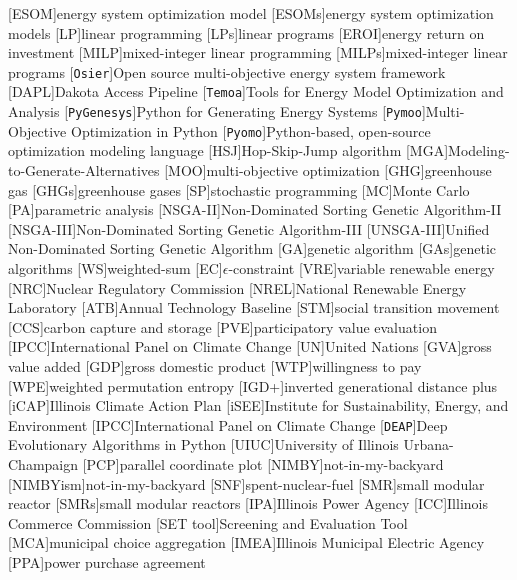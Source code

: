 [ESOM]{energy system optimization model}
[ESOMs]{energy system optimization models}
[LP]{linear programming}
[LPs]{linear programs}
[EROI]{energy return on investment}
[MILP]{mixed-integer linear programming}
[MILPs]{mixed-integer linear programs}
[\texttt{Osier}]{Open source multi-objective energy system framework}
[DAPL]{Dakota Access Pipeline}
[\texttt{Temoa}]{Tools for Energy Model Optimization and Analysis}
[\texttt{PyGenesys}]{Python for Generating Energy Systems}
[\texttt{Pymoo}]{Multi-Objective Optimization in Python}
[\texttt{Pyomo}]{Python-based, open-source optimization modeling language}
[HSJ]{Hop-Skip-Jump algorithm}
[MGA]{Modeling-to-Generate-Alternatives}
[MOO]{multi-objective optimization}
[GHG]{greenhouse gas}
[GHGs]{greenhouse gases}
[SP]{stochastic programming}
[MC]{Monte Carlo}
[PA]{parametric analysis}
[NSGA-II]{Non-Dominated Sorting Genetic Algorithm-II}
[NSGA-III]{Non-Dominated Sorting Genetic Algorithm-III}
[UNSGA-III]{Unified Non-Dominated Sorting Genetic Algorithm}
[GA]{genetic algorithm}
[GAs]{genetic algorithms}
[WS]{weighted-sum}
[EC]{$\epsilon$-constraint}
[VRE]{variable renewable energy}
[NRC]{Nuclear Regulatory Commission}
[NREL]{National Renewable Energy Laboratory}
[ATB]{Annual Technology Baseline}
[STM]{social transition movement}
[CCS]{carbon capture and storage}
[PVE]{participatory value evaluation}
[IPCC]{International Panel on Climate Change}
[UN]{United Nations}
[GVA]{gross value added}
[GDP]{gross domestic product}
[WTP]{willingness to pay}
[WPE]{weighted permutation entropy}
[IGD+]{inverted generational distance plus}
[iCAP]{Illinois Climate Action Plan}
[iSEE]{Institute for Sustainability, Energy, and Environment}
[IPCC]{International Panel on Climate Change}
[\texttt{DEAP}]{Deep Evolutionary Algorithms in Python}
[UIUC]{University of Illinois Urbana-Champaign}
[PCP]{parallel coordinate plot}
[NIMBY]{not-in-my-backyard}
[NIMBYism]{not-in-my-backyard}
[SNF]{spent-nuclear-fuel}
[SMR]{small modular reactor}
[SMRs]{small modular reactors}
[IPA]{Illinois Power Agency}
[ICC]{Illinois Commerce Commission}
[SET tool]{Screening and Evaluation Tool}
[MCA]{municipal choice aggregation}
[IMEA]{Illinois Municipal Electric Agency}
[PPA]{power purchase agreement}